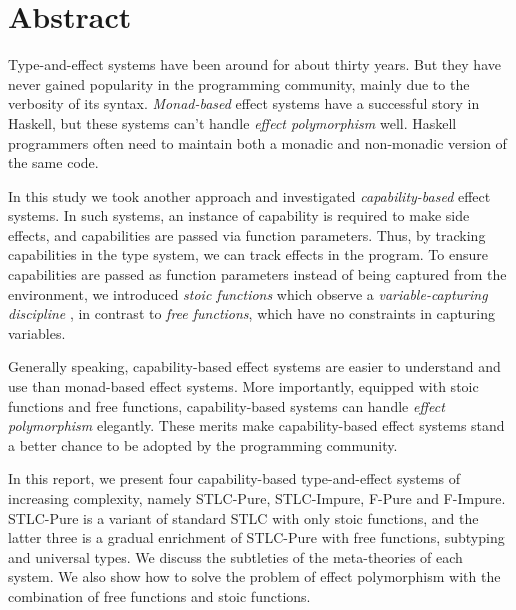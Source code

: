 \section*{\centering Abstract}

Type-and-effect systems have been around for about thirty years. But
they have never gained popularity in the programming community, mainly
due to the verbosity of its syntax. \emph{Monad-based} effect systems
have a successful story in Haskell, but these systems can't handle
\emph{effect polymorphism} well.  Haskell programmers often need to
maintain both a monadic and non-monadic version of the same code.

In this study we took another approach and investigated
\emph{capability-based} effect systems. In such systems, an instance
of capability is required to make side effects, and capabilities are
passed via function parameters. Thus, by tracking capabilities in the
type system, we can track effects in the program. To ensure
capabilities are passed as function parameters instead of being
captured from the environment, we introduced \emph{stoic functions}
which observe a \emph{variable-capturing discipline} , in contrast to
\emph{free functions}, which have no constraints in capturing
variables.

Generally speaking, capability-based effect systems are easier to
understand and use than monad-based effect systems. More importantly,
equipped with stoic functions and free functions, capability-based
systems can handle \emph{effect polymorphism} elegantly. These merits
make capability-based effect systems stand a better chance to be
adopted by the programming community.

In this report, we present four capability-based type-and-effect
systems of increasing complexity, namely STLC-Pure, STLC-Impure,
F-Pure and F-Impure. STLC-Pure is a variant of standard STLC with only
stoic functions, and the latter three is a gradual enrichment of
STLC-Pure with free functions, subtyping and universal types. We
discuss the subtleties of the meta-theories of each system. We also
show how to solve the problem of effect polymorphism with the
combination of free functions and stoic functions.
